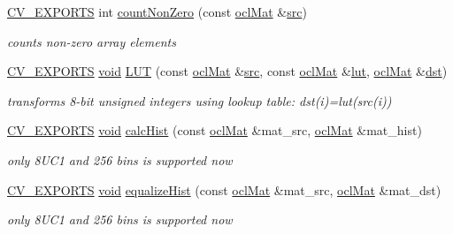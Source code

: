 \begin{DoxyCompactItemize}
\hyperlink{core_2types__c_8h_a1bf9f0e121b54272da02379cfccd0a2b}{C\-V\-\_\-\-E\-X\-P\-O\-R\-T\-S} int \hyperlink{namespacecv_1_1ocl_af3fad3d02e878726c973656dd63cba5b}{count\-Non\-Zero} (const \hyperlink{classcv_1_1ocl_1_1oclMat}{ocl\-Mat} \&\hyperlink{legacy_8hpp_a371cd109b74033bc4366f584edd3dacc}{src})
\begin{DoxyCompactList}\small\item\em counts non-\/zero array elements \end{DoxyCompactList}\item 
\hyperlink{core_2types__c_8h_a1bf9f0e121b54272da02379cfccd0a2b}{C\-V\-\_\-\-E\-X\-P\-O\-R\-T\-S} \hyperlink{legacy_8hpp_a8bb47f092d473522721002c86c13b94e}{void} \hyperlink{namespacecv_1_1ocl_a93bad34668dd9b2a59e5a3d35951208b}{L\-U\-T} (const \hyperlink{classcv_1_1ocl_1_1oclMat}{ocl\-Mat} \&\hyperlink{legacy_8hpp_a371cd109b74033bc4366f584edd3dacc}{src}, const \hyperlink{classcv_1_1ocl_1_1oclMat}{ocl\-Mat} \&\hyperlink{core__c_8h_ac0182572699c7759eba7ba1d6b8e32d6}{lut}, \hyperlink{classcv_1_1ocl_1_1oclMat}{ocl\-Mat} \&\hyperlink{photo__c_8h_aed13e2a25279b24dc954073233fef7a5}{dst})
\begin{DoxyCompactList}\small\item\em transforms 8-\/bit unsigned integers using lookup table\-: dst(i)=lut(src(i)) \end{DoxyCompactList}\item 
\hyperlink{core_2types__c_8h_a1bf9f0e121b54272da02379cfccd0a2b}{C\-V\-\_\-\-E\-X\-P\-O\-R\-T\-S} \hyperlink{legacy_8hpp_a8bb47f092d473522721002c86c13b94e}{void} \hyperlink{namespacecv_1_1ocl_a4d96ecf2e2b14752771842da58348af0}{calc\-Hist} (const \hyperlink{classcv_1_1ocl_1_1oclMat}{ocl\-Mat} \&mat\-\_\-src, \hyperlink{classcv_1_1ocl_1_1oclMat}{ocl\-Mat} \&mat\-\_\-hist)
\begin{DoxyCompactList}\small\item\em only 8\-U\-C1 and 256 bins is supported now \end{DoxyCompactList}\item 
\hyperlink{core_2types__c_8h_a1bf9f0e121b54272da02379cfccd0a2b}{C\-V\-\_\-\-E\-X\-P\-O\-R\-T\-S} \hyperlink{legacy_8hpp_a8bb47f092d473522721002c86c13b94e}{void} \hyperlink{namespacecv_1_1ocl_ada349777e957d821d3614cf2add4084e}{equalize\-Hist} (const \hyperlink{classcv_1_1ocl_1_1oclMat}{ocl\-Mat} \&mat\-\_\-src, \hyperlink{classcv_1_1ocl_1_1oclMat}{ocl\-Mat} \&mat\-\_\-dst)
\begin{DoxyCompactList}\small\item\em only 8\-U\-C1 and 256 bins is supported now \end{DoxyCompactList}\item 

\end{DoxyCompactItemize}
